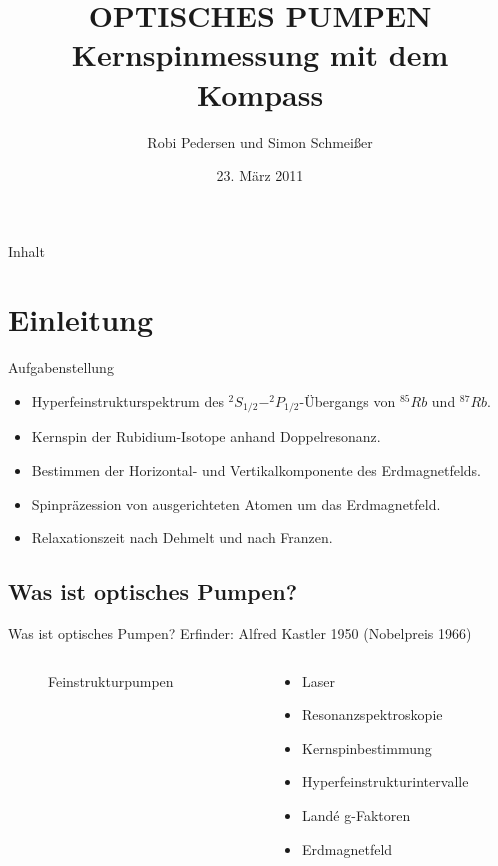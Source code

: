 \documentclass{beamer}
\title[Optisches Pumpen]{OPTISCHES PUMPEN \\ Kernspinmessung mit dem Kompass}
\author{Robi Pedersen und Simon Schmeißer}
\institute{Albert-Ludwigs-Universität Freiburg}
\date{23. März 2011}
\begin{document}
\begin{frame}
\titlepage
\end{frame}

\begin{frame}[shrink]{Inhalt}
\tableofcontents
\end{frame}


\section{Einleitung}

\begin{frame}{Aufgabenstellung} %
\begin{itemize}
\item Hyperfeinstrukturspektrum des $^2S_{1/2} - ^2P_{1/2}$-Übergangs von $^{85}Rb$ und $^{87}Rb$.
\item Kernspin der Rubidium-Isotope anhand Doppelresonanz.
\item Bestimmen der Horizontal- und Vertikalkomponente des Erdmagnetfelds. 
\item Spinpräzession von ausgerichteten Atomen um das Erdmagnetfeld.
\item Relaxationszeit nach Dehmelt und nach Franzen. 
\end{itemize}
\end{frame}


\subsection{Was ist optisches Pumpen?}

\begin{frame}{Was ist optisches Pumpen?}
Erfinder: Alfred Kastler 1950 (Nobelpreis 1966)
\begin{columns}
\begin{column}{5cm}
	\begin{figure}[H]
	\caption{Feinstrukturpumpen}
	\end{figure}
\end{column}
\begin{column}{5cm}
	\begin{itemize}
	\pause \item Laser
	\pause \item Resonanzspektroskopie
	\pause \item Kernspinbestimmung
	\pause \item Hyperfeinstrukturintervalle
	\pause \item Landé g-Faktoren
	\pause \item Erdmagnetfeld
	\end{itemize}
\end{column}
\end{columns}
\end{frame}
\end{document}
